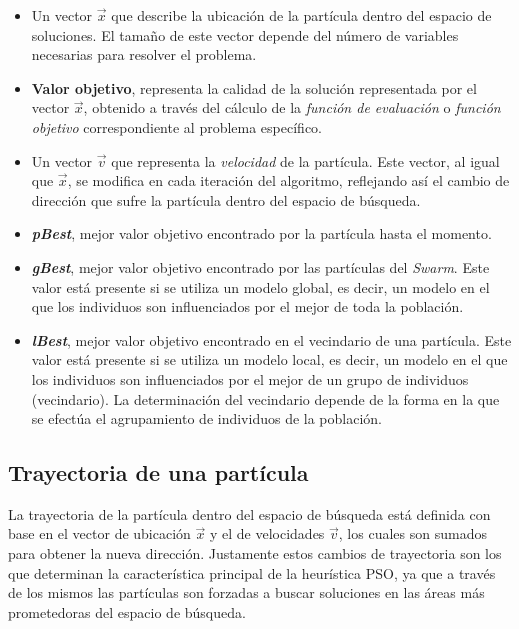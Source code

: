   \begin{itemize}
   \item Un vector $\vec{x}$ que describe la ubicaci\'on de la part\'icula dentro del espacio de soluciones. El tama\~no de este vector 
   depende del n\'umero de variables necesarias para resolver el problema.
   \item \textbf{Valor objetivo}, representa la calidad de la soluci\'on representada por el vector $\vec{x}$, obtenido a trav\'es del c\'alculo 
   de la \textit{funci\'on de evaluaci\'on} o \textit{funci\'on objetivo} correspondiente al problema espec\'ifico.
   \item Un vector $\vec{v}$ que representa la \textit{velocidad} de la part\'icula. Este vector, al igual que $\vec{x}$, se modifica en cada 
   iteraci\'on del algoritmo, reflejando as\'i el cambio de direcci\'on que sufre la part\'icula  dentro del espacio de b\'usqueda.
   \item \textbf{\textit{pBest}}, mejor valor objetivo encontrado por la part\'icula hasta el momento. 
   \item \textbf{\textit{gBest}}, mejor valor objetivo encontrado por las part\'iculas del \textit{Swarm}. Este valor est\'a presente si se 
   utiliza un modelo global, es decir, un modelo en el que los individuos son influenciados por el mejor de toda la poblaci\'on.
   \item \textbf{\textit{lBest}}, mejor valor objetivo encontrado en el vecindario de una part\'icula. Este valor est\'a presente si se 
   utiliza un modelo local, es decir, un modelo en el que los individuos son influenciados por el mejor de un grupo de individuos 
   (vecindario). La determinaci\'on del vecindario depende de la forma en la que se efect\'ua el agrupamiento de individuos de la poblaci\'on.
  \end{itemize}
 
    \subsection{Trayectoria de una part\'icula}
    
    La trayectoria de la part\'icula dentro del espacio de b\'usqueda est\'a definida con base en el vector de ubicaci\'on $\vec{x}$ 
    y el de velocidades $\vec{v}$, los cuales son sumados para obtener la nueva direcci\'on. Justamente estos cambios de trayectoria 
    son los que determinan la caracter\'istica principal de la heur\'istica PSO, ya que a trav\'es de los mismos las part\'iculas son 
    forzadas a buscar soluciones en las \'areas m\'as prometedoras del espacio de b\'usqueda.

